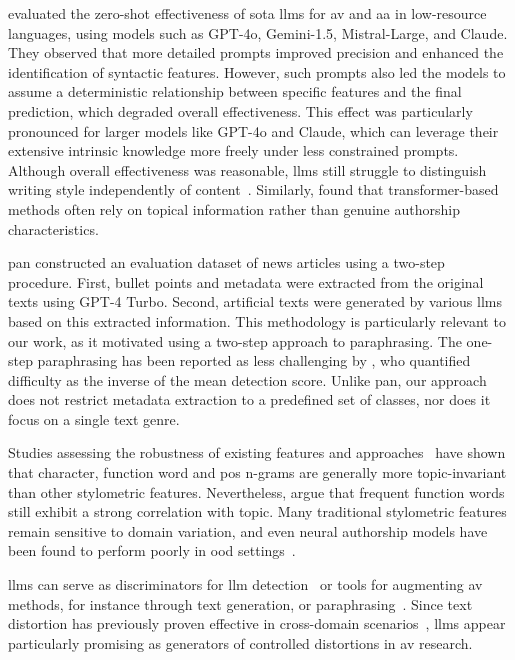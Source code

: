 \citet{schmidt_llm_av_latin_24} evaluated the zero-shot effectiveness of \acl{sota} \acp{llm} for \ac{av} and \ac{aa} in low-resource languages, using models such as GPT-4o, Gemini-1.5, Mistral-Large, and Claude. 
They observed that more detailed prompts improved precision and enhanced the identification of syntactic features. 
However, such prompts also led the models to assume a deterministic relationship between specific features and the final prediction, which degraded overall effectiveness. 
This effect was particularly pronounced for larger models like GPT-4o and Claude, which can leverage their extensive intrinsic knowledge more freely under less constrained prompts. 
Although overall effectiveness was reasonable, \acp{llm} still struggle to distinguish writing style independently of content~\citep{schmidt_llm_av_latin_24}. 
Similarly, \citet{nguyen_bert_topic_av_2023} found that transformer-based methods often rely on topical information rather than genuine authorship characteristics.

\ac{pan} constructed an evaluation dataset of news articles using a two-step procedure.
First, bullet points and metadata were extracted from the original texts using GPT-4 Turbo.
Second, artificial texts were generated by various \acp{llm} based on this extracted information. 
This methodology is particularly relevant to our work, as it motivated using a two-step approach to paraphrasing. 
The one-step paraphrasing has been reported as less challenging by \citet{bevendorff_overview_2024}, who quantified difficulty as the inverse of the mean detection score.
Unlike \ac{pan}, our approach does not restrict metadata extraction to a predefined set of classes, nor does it focus on a single text genre. 

Studies assessing the robustness of existing features and approaches~\citep{stamatatos_survey_2009,barlas_cross_domain_2020} have shown that character, function word and \ac{pos} n-grams are generally more topic-invariant than other stylometric features.
Nevertheless, \citet{bischoff_importance_2020} argue that frequent function words still exhibit a strong correlation with topic.
Many traditional stylometric features remain sensitive to domain variation, and even neural authorship models have been found to perform poorly in \ac{ood} settings~\citep{rivera_soto_learning_2021}.

\acp{llm} can serve as discriminators for \ac{llm} detection~\citep{futrzynski_pairwise_2021} or tools for augmenting \ac{av} methods, for instance through text generation, or paraphrasing~\citep{mao_raidar_2024,baradia_mirror_2025}.
Since text distortion has previously proven effective in cross-domain scenarios~\citep{bischoff_importance_2020}, \acp{llm} appear particularly promising as generators of controlled distortions in \ac{av} research.

